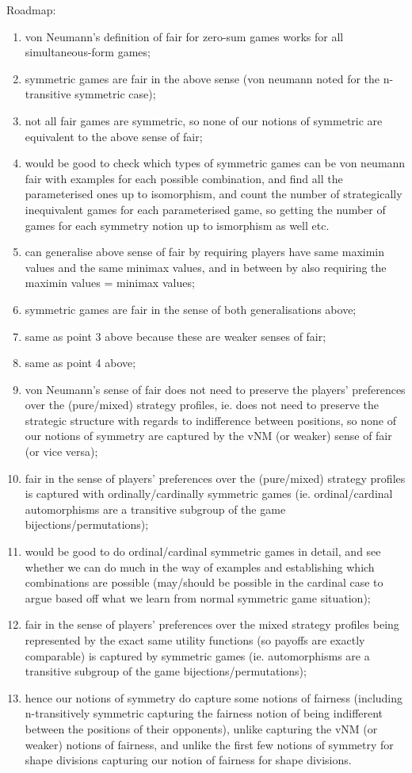 Roadmap:
\begin{enumerate}
	\item von Neumann's definition of fair for zero-sum games works for all simultaneous-form games;
	\item symmetric games are fair in the above sense (von neumann noted for the n-transitive symmetric case);
	\item not all fair games are symmetric, so none of our notions of symmetric are equivalent to the above sense of fair;
	\item would be good to check which types of symmetric games can be von neumann fair with examples for each possible combination, and find all the parameterised ones up to isomorphism, and count the number of strategically inequivalent games for each parameterised game, so getting the number of games for each symmetry notion up to ismorphism as well etc.
	\item can generalise above sense of fair by requiring players have same maximin values and the same minimax values, and in between by also requiring the maximin values = minimax values;
	\item symmetric games are fair in the sense of both generalisations above;
	\item same as point 3 above because these are weaker senses of fair;
	\item same as point 4 above;
	\item von Neumann's sense of fair does not need to preserve the players' preferences over the (pure/mixed) strategy profiles, ie. does not need to preserve the strategic structure with regards to indifference between positions, so none of our notions of symmetry are captured by the vNM (or weaker) sense of fair (or vice versa);
	\item fair in the sense of players' preferences over the (pure/mixed) strategy profiles is captured with ordinally/cardinally symmetric games (ie. ordinal/cardinal automorphisms are a transitive subgroup of the game bijections/permutations);
	\item would be good to do ordinal/cardinal symmetric games in detail, and see whether we can do much in the way of examples and establishing which combinations are possible (may/should be possible in the cardinal case to argue based off what we learn from normal symmetric game situation);
	\item fair in the sense of players' preferences over the mixed strategy profiles being represented by the exact same utility functions (so payoffs are exactly comparable) is captured by symmetric games (ie. automorphisms are a transitive subgroup of the game bijections/permutations);
	\item hence our notions of symmetry do capture some notions of fairness (including n-transitively symmetric capturing the fairness notion of being indifferent between the positions of their opponents), unlike capturing the vNM (or weaker) notions of fairness, and unlike the first few notions of symmetry for shape divisions capturing our notion of fairness for shape divisions.
\end{enumerate}



